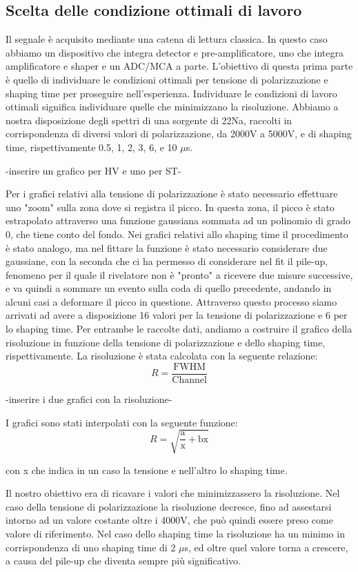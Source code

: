 \documentclass[a4paper,10pt]{article}
\begin{document}
\subsection{Scelta delle condizione ottimali di lavoro}
Il segnale è acquisito mediante una catena di lettura classica. In questo caso abbiamo un dispositivo che integra detector e pre-amplificatore, uno che integra amplificatore e shaper e un ADC/MCA a parte. L'obiettivo di questa prima parte è quello di individuare le condizioni ottimali per tensione di polarizzazione e shaping time per proseguire nell'esperienza. Individuare le condizioni di lavoro ottimali significa individuare quelle che minimizzano la risoluzione. Abbiamo a nostra disposizione degli spettri di una sorgente di 22Na, raccolti in corrispondenza di diversi valori di polarizzazione, da 2000V a 5000V, e di shaping time, rispettivamente 0.5, 1, 2, 3, 6, e 10 $\mu$s. 

-inserire un grafico per HV e uno per ST-

Per i grafici relativi alla tensione di polarizzazione è stato necessario effettuare uno "zoom" sulla zona dove si registra il picco. In questa zona, il picco è stato estrapolato attraverso una funzione gaussiana sommata ad un polinomio di grado 0, che tiene conto del fondo. Nei grafici relativi allo shaping time il procedimento è stato analogo, ma nel fittare la funzione è stato necessario considerare due gaussiane, con la seconda che ci ha permesso di considerare nel fit il pile-up, fenomeno per il quale il rivelatore non è "pronto" a ricevere due misure successive, e va quindi a sommare un evento sulla coda di quello precedente, andando in alcuni casi a deformare il picco in questione. Attraverso questo processo siamo arrivati ad avere a disposizione 16 valori per la tensione di polarizzazione e 6 per lo shaping time. Per entrambe le raccolte dati, andiamo a costruire il grafico della risoluzione in funzione della tensione di polarizzazione e dello shaping time, rispettivamente. La risoluzione è stata calcolata con la seguente relazione: 
$$
	R=\frac{\textrm{FWHM}}{\textrm{Channel}}
$$

-inserire i due grafici con la risoluzione-

I grafici sono stati interpolati con la seguente funzione: 
$$
	R=\sqrt{\frac{\textrm{a}}{\textrm{x}}+\textrm{bx}}
$$

con x che indica in un caso la tensione e nell'altro lo shaping time.

Il nostro obiettivo era di ricavare i valori che minimizzassero la risoluzione. Nel caso della tensione di polarizzazione la risoluzione decresce, fino ad assestarsi intorno ad un valore costante oltre i 4000V, che può quindi essere preso come valore di riferimento. Nel caso dello shaping time la risoluzione ha un minimo in corrispondenza di uno shaping time di 2 $\mu$s, ed oltre quel valore torna a crescere, a causa del pile-up che diventa sempre più significativo.
\end{document}
